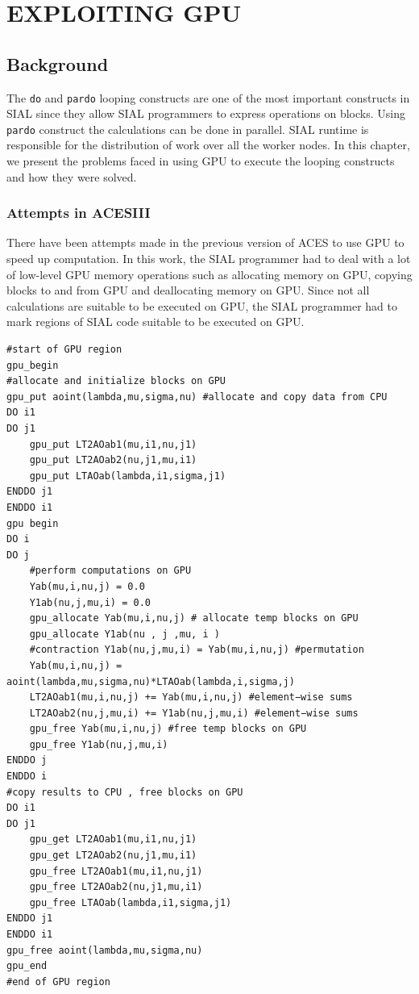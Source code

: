 \chapter{EXPLOITING GPU}\label{exploitinggpu}
\section{Background}
The \texttt{do} and \texttt{pardo} looping constructs are one of the most important
constructs in SIAL since they allow SIAL programmers to express operations on
blocks. Using \texttt{pardo} construct the calculations can be done in parallel.
SIAL runtime is responsible for the distribution of work over all the worker nodes.
In this chapter, we present the problems faced in using GPU to execute the looping
constructs and how they were solved.

\subsection{Attempts in ACESIII}
There have been attempts\cite{Jindal2016} made in the previous version of ACES
to use GPU to speed up computation. In this work, the SIAL programmer had to deal
with a lot of low-level GPU memory operations such as allocating memory on GPU,
copying blocks to and from GPU and deallocating memory on GPU. Since not all
calculations are suitable to be executed on GPU, the SIAL programmer had to mark
regions of SIAL code suitable to be executed on GPU.

\begin{lstlisting}[caption={Code Fragment from ACESIII for CCSD calculation},
  label={lst:ACESIII_gpucode}]
#start of GPU region
gpu_begin
#allocate and initialize blocks on GPU
gpu_put aoint(lambda,mu,sigma,nu) #allocate and copy data from CPU
DO i1
DO j1
    gpu_put LT2AOab1(mu,i1,nu,j1)
    gpu_put LT2AOab2(nu,j1,mu,i1)
    gpu_put LTAOab(lambda,i1,sigma,j1)
ENDDO j1
ENDDO i1
gpu begin
DO i
DO j
    #perform computations on GPU
    Yab(mu,i,nu,j) = 0.0
    Y1ab(nu,j,mu,i) = 0.0
    gpu_allocate Yab(mu,i,nu,j) # allocate temp blocks on GPU
    gpu_allocate Y1ab(nu , j ,mu, i )
    #contraction Y1ab(nu,j,mu,i) = Yab(mu,i,nu,j) #permutation
    Yab(mu,i,nu,j) = aoint(lambda,mu,sigma,nu)*LTAOab(lambda,i,sigma,j)
    LT2AOab1(mu,i,nu,j) += Yab(mu,i,nu,j) #element−wise sums
    LT2AOab2(nu,j,mu,i) += Y1ab(nu,j,mu,i) #element−wise sums
    gpu_free Yab(mu,i,nu,j) #free temp blocks on GPU
    gpu_free Y1ab(nu,j,mu,i)
ENDDO j
ENDDO i
#copy results to CPU , free blocks on GPU
DO i1
DO j1
    gpu_get LT2AOab1(mu,i1,nu,j1)
    gpu_get LT2AOab2(nu,j1,mu,i1)
    gpu_free LT2AOab1(mu,i1,nu,j1)
    gpu_free LT2AOab2(nu,j1,mu,i1)
    gpu_free LTAOab(lambda,i1,sigma,j1)
ENDDO j1
ENDDO i1
gpu_free aoint(lambda,mu,sigma,nu)
gpu_end
#end of GPU region
\end{lstlisting}

